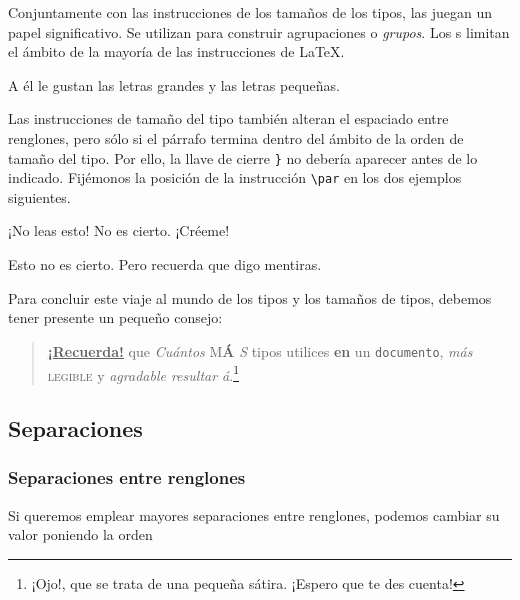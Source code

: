 Conjuntamente con las  instrucciones de los tamaños de  los tipos, las
 juegan un papel  significativo. Se utilizan para construir
agrupaciones o \emph{grupos}. Los s  limitan el ámbito de la
mayoría de las instrucciones de \LaTeX.

\begin{example}
A él le gustan las {\LARGE
letras grandes y las letras
{\small pequeñas}}.
\end{example}

Las  instrucciones de  tamaño del  tipo también  alteran el  espaciado
entre renglones, pero sólo si el  párrafo termina dentro del ámbito de
la orden de tamaño del tipo. Por  ello, la llave de cierre \verb|}| no
debería aparecer  antes de  lo indicado. Fijémonos  la posición  de la
instrucción \verb|\par| en los dos ejemplos siguientes.

\begin{example}
{\Large ¡No leas esto! No es
cierto. ¡Créeme!\par}
\end{example}
\begin{example}
{\Large Esto no es cierto.
Pero recuerda que digo
mentiras.}\par
\end{example}

Para concluir este viaje al mundo de los tipos y los tamaños de tipos,
debemos tener presente un pequeño consejo:

\nopagebreak
\begin{quote}
  \underline{\textbf{¡Recuerda\Huge!}} que \textit{Cuántos}
  \textsf{M\textbf{\LARGE Á} \textsl{S}} tipos \Huge utilices 
  \footnotesize \textbf{en} un \small \texttt{documento}\Huge,
  \large \textit{más} \normalsize \textsc{legible} y
  \textsl{\textsf{agradable} resul\large t\Large a\LARGE r\huge
    á}.\footnote{¡Ojo!, que se trata de una pequeña sátira.
    ¡Espero que te des cuenta!}
\end{quote}

\subsection{Separaciones}
 
\subsubsection{Separaciones entre renglones}

  Si   queremos  emplear
mayores  separaciones  entre  renglones,   podemos  cambiar  su  valor
poniendo la orden

